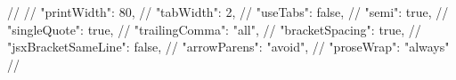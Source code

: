 // {
//   "printWidth": 80,
//   "tabWidth": 2,
//   "useTabs": false,
//   "semi": true,
//   "singleQuote": true,
//   "trailingComma": "all",
//   "bracketSpacing": true,
//   "jsxBracketSameLine": false,
//   "arrowParens": "avoid",
//   "proseWrap": "always"
// }